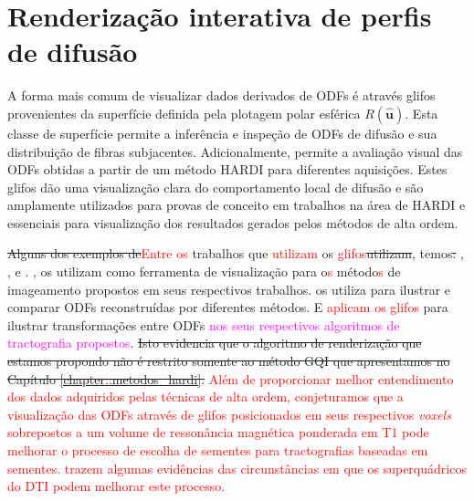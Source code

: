 \documentclass[
    12pt,                %
    oneside,            %
    a4paper,            %
    english,            %
    french,                %
    spanish,            %
    brazil                %
    ]{abntex2}
\begin{document}
\chapter{Renderização interativa de perfis de difusão}
\label{chap::renderizacao_interativa_de_perfis_de_difusao}



A forma mais comum de visualizar dados derivados de ODFs é através glifos provenientes da superfície definida pela plotagem polar esférica $R(\mathbf{\hat{u}})$. Esta classe de superfície permite a inferência e inspeção de ODFs de difusão e sua distribuição de fibras subjacentes. Adicionalmente, permite a avaliação visual das ODFs obtidas a partir de um método HARDI para diferentes aquisições. Estes glifos dão uma visualização clara do comportamento local de difusão e são amplamente utilizados para provas de conceito em trabalhos na área de HARDI e essenciais para visualização dos resultados gerados pelos métodos de alta ordem.

\sout{Alguns dos exemplos de}\textcolor{red}{Entre os} trabalhos que \textcolor{red}{utilizam} os \textcolor{red}{glifos}\sout{utilizam}, temos\sout{:} ,  ,    e  . ,   os utilizam como ferramenta de visualização para o\textcolor{red}{s} método\textcolor{red}{s} de imageamento propostos em seus respectivos trabalhos.  os utiliza para ilustrar e comparar ODFs reconstruídas por diferentes métodos. E  \textcolor{red}{aplicam os glifos}  para ilustrar transformações entre ODFs \textcolor{magenta}{nos seus respectivos algoritmos de tractografia propostos}. \sout{Isto evidencia que o algoritmo de renderização que estamos propondo não é restrito somente ao método GQI que apresentamos no Capítulo \ref{chapter::metodos_hardi}.}
\textcolor{red}{Além de proporcionar melhor entendimento dos dados adquiridos pelas técnicas de alta ordem, conjeturamos que a visualização das ODFs através de glifos posicionados em seus respectivos \textit{voxels} sobrepostos a um volume de ressonância magnética ponderada em T1 pode melhorar o processo de escolha de sementes para tractografias baseadas em sementes.  trazem algumas evidências das circunstâncias em que os superquádricos do DTI podem melhorar este processo.}
\end{document}
